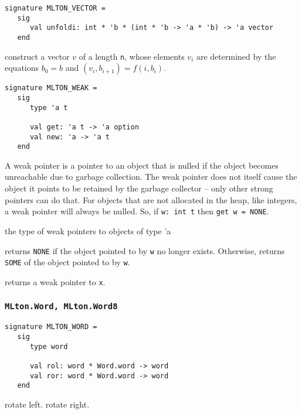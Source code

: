 \begin{verbatim}
signature MLTON_VECTOR =
   sig
      val unfoldi: int * 'b * (int * 'b -> 'a * 'b) -> 'a vector
   end
\end{verbatim}

\begin{description}

construct a vector $v$ of a length {\tt n}, whose elements $v_i$ are determined
by the equations $b_0 = b$ and $(v_i, b_{i+1}) = f (i, b_i)$.

\end{description}

\begin{verbatim}
signature MLTON_WEAK =
   sig
      type 'a t

      val get: 'a t -> 'a option
      val new: 'a -> 'a t
   end
\end{verbatim}

A weak pointer is a pointer to an object that is nulled if the
object becomes unreachable due to garbage collection.  The weak
pointer does not itself cause the object it points to be retained by
the garbage collector -- only other strong pointers can do that.
For objects that are not allocated in the heap, like integers, a weak
pointer will always be nulled.  So, if {\tt w: int t} then
{\tt get w = NONE}.

\begin{description}
the type of weak pointers to objects of type 'a

returns {\tt NONE} if the object pointed to by {\tt w} no longer
exists.  Otherwise, returns {\tt SOME} of the object pointed to by
{\tt w}.

returns a weak pointer to {\tt x}.
\end{description}
%
\subsubsection{\tt MLton.Word, MLton.Word8}

\begin{verbatim}
signature MLTON_WORD =
   sig
      type word
         
      val rol: word * Word.word -> word
      val ror: word * Word.word -> word
   end
\end{verbatim}

\begin{description}
rotate left.
rotate right.
\end{description}

